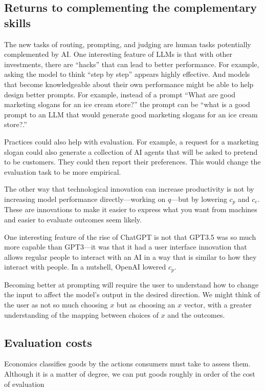 \documentclass{article}
\begin{document}
\subsection{Returns to complementing the complementary skills}
The new tasks of routing, prompting, and judging are human tasks potentially complemented by AI. 
One interesting feature of LLMs is that with other investments, there are ``hacks'' that can lead to better performance. For example, asking the model to think ``step by step'' appears highly effective. 
And models that become knowledgeable about their own performance might be able to help design better prompts. 
For example, instead of a prompt ``What are good marketing slogans for an ice cream store?'' the prompt can be  ``what is a good prompt to an LLM that would generate good marketing slogans for an ice cream store?.''

Practices could also help with evaluation. 
For example, a request for a marketing slogan could also generate a collection of AI agents that will be asked to pretend to be customers.
They could then report their preferences. 
This would change the evaluation task to be more empirical. 

The other way that technological innovation can increase productivity is not by increasing model performance directly---working on $q$---but by lowering $c_p$ and $c_e$. 
These are innovations to make it easier to express what you want from machines and easier to evaluate outcomes seem likely. 

One interesting feature of the rise of ChatGPT is not that GPT3.5 was so much more capable than GPT3---it was that it had a user interface innovation that allows regular people to interact with an AI in a way that is similar to how they interact with people.
In a nutshell, OpenAI lowered $c_p$.

Becoming better at prompting will require the user to understand how to change the input to affect the model's output in the desired direction. 
We might think of the user as not so much choosing $x$ but as choosing an $x$ vector, with a greater understanding of the mapping between choices of $x$ and the outcomes.

\subsection{Evaluation costs}
Economics classifies goods by the actions consumers must take to assess them. 
Although it is a matter of degree, we can put goods roughly in order of the cost of evaluation
\end{document}
